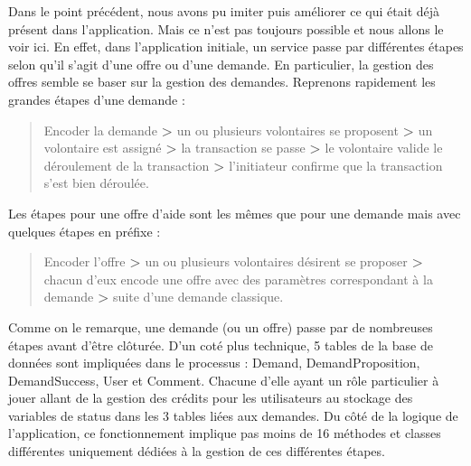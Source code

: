 {\begin{description}
\begin{minipage}{.5\textwidth}

\end{minipage}
\vspace{0.3cm}


\item[Les offres/demandes]
Dans le point précédent,  nous avons pu imiter puis améliorer ce qui était déjà présent dans l'application.  Mais ce n'est pas toujours possible et nous allons le voir ici.  En effet,  dans l'application initiale,  un service passe par différentes étapes selon qu'il s'agit d'une offre ou d'une demande.  En particulier,  la gestion des offres semble se baser sur la gestion des demandes.  Reprenons rapidement les grandes étapes d'une demande : \\

\begin{framed} \begin{quote}
Encoder la demande \textbf{>} un ou plusieurs volontaires se proposent \textbf{>} un volontaire est assigné \textbf{>} la transaction se passe \textbf{>} le volontaire valide le déroulement de la transaction \textbf{>} l'initiateur confirme que la transaction s'est bien déroulée.
 \end{quote} \end{framed}

Les étapes pour une offre d'aide sont les mêmes que pour une demande mais avec quelques étapes en préfixe : 

\begin{framed} \begin{quote}
Encoder l'offre \textbf{>} un ou plusieurs volontaires désirent se proposer \textbf{>} chacun d'eux encode une offre avec des paramètres correspondant à la demande \textbf{>} suite d'une demande classique.
 \end{quote} \end{framed}

Comme on le remarque,  une demande (ou un offre) passe par de nombreuses étapes avant d'être clôturée.  D'un coté plus technique,  5 tables de la base de données sont impliquées dans le processus : Demand,  DemandProposition,  DemandSuccess,  User et Comment.  Chacune d'elle ayant un rôle particulier à jouer allant de la gestion des crédits pour les utilisateurs au stockage des variables de status dans les 3 tables liées aux demandes.  Du côté de la logique de l'application,  ce fonctionnement implique pas moins de 16 méthodes et classes différentes uniquement dédiées à la gestion de ces différentes étapes.  


\end{description}}
